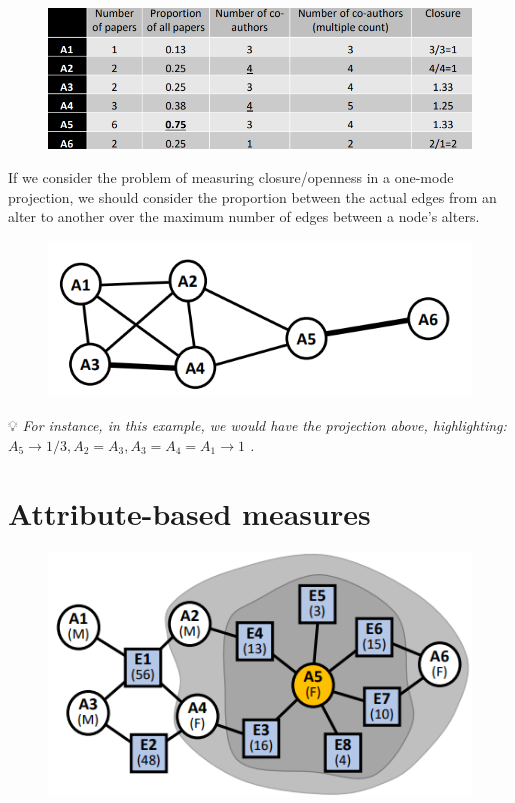 \documentclass[
  notitlepage,
  onecolumn,
  openany]{book}
\begin{document}
\begin{figure}[h!]

{\centering \includegraphics[width=0.5\linewidth]{images/10-Two mode networks/Untitled 10} 

}

\end{figure}

If we consider the problem of measuring closure/openness in a one-mode projection, we should consider the proportion between the actual edges from an alter to another over the maximum number of edges between a node's alters.

\begin{figure}[h!]

{\centering \includegraphics[width=0.5\linewidth]{images/10-Two mode networks/Untitled 11} 

}

\end{figure}

💡 \emph{For instance, in this example, we would have the projection above, highlighting:
\(A_5 \rightarrow 1/3, A_2=A_3, A_3=A_4= A_1\rightarrow 1\) .}

\hypertarget{attribute-based-measures}{%
\section{Attribute-based measures}\label{attribute-based-measures}}

\begin{figure}[h!]

{\centering \includegraphics[width=0.4\linewidth]{images/10-Two mode networks/Untitled 12} 

}

\end{figure}
\end{document}
